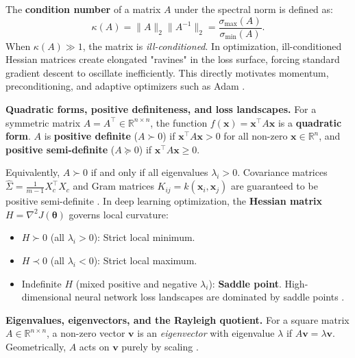 \documentclass[11pt,a4paper]{article}
\begin{document}
	The \textbf{condition number} of a matrix $A$ under the spectral norm is defined as:
	\begin{equation}
		\kappa(A) = \|A\|_2 \|A^{-1}\|_2 = \frac{\sigma_{\max}(A)}{\sigma_{\min}(A)}.
		\label{eq:condition_number}
	\end{equation}
	When $\kappa(A) \gg 1$, the matrix is \emph{ill-conditioned}. In optimization, ill-conditioned Hessian matrices create elongated "ravines" in the loss surface, forcing standard gradient descent to oscillate inefficiently. This directly motivates momentum, preconditioning, and adaptive optimizers such as Adam \parencite{boyd2004, strang2019, trefethen1997}.

	\textbf{Quadratic forms, positive definiteness, and loss landscapes.}
	For a symmetric matrix $A = A^{\!\top} \in \mathbb{R}^{n \times n}$, the function $f(\mathbf{x}) = \mathbf{x}^{\!\top}A\mathbf{x}$ is a \textbf{quadratic form}.
	$A$ is \textbf{positive definite} ($A \succ 0$) if $\mathbf{x}^{\!\top}A\mathbf{x} > 0$ for all non-zero $\mathbf{x} \in \mathbb{R}^n$, and \textbf{positive semi-definite} ($A \succeq 0$) if $\mathbf{x}^{\!\top}A\mathbf{x} \ge 0$.

	Equivalently, $A \succ 0$ if and only if all eigenvalues $\lambda_i > 0$. Covariance matrices $\hat\Sigma = \frac{1}{m-1} X_c^\top X_c$ and Gram matrices $K_{ij} = k(\mathbf{x}_i, \mathbf{x}_j)$ are guaranteed to be positive semi-definite \parencite{bishop2006}. In deep learning optimization, the \textbf{Hessian matrix} $H = \nabla^2 J(\boldsymbol{\theta})$ governs local curvature:
	\begin{itemize}[nosep]
		\item $H \succ 0$ (all $\lambda_i > 0$): Strict local minimum.
		\item $H \prec 0$ (all $\lambda_i < 0$): Strict local maximum.
		\item Indefinite $H$ (mixed positive and negative $\lambda_i$): \textbf{Saddle point}. High-dimensional neural network loss landscapes are dominated by saddle points \parencite{goodfellow2016}.
	\end{itemize}

	\textbf{Eigenvalues, eigenvectors, and the Rayleigh quotient.}
	For a square matrix $A \in \mathbb{R}^{n \times n}$, a non-zero vector $\mathbf{v}$ is an \emph{eigenvector} with eigenvalue $\lambda$ if $A\mathbf{v} = \lambda \mathbf{v}$. Geometrically, $A$ acts on $\mathbf{v}$ purely by scaling \parencite{strang2012linear}.
\end{document}

